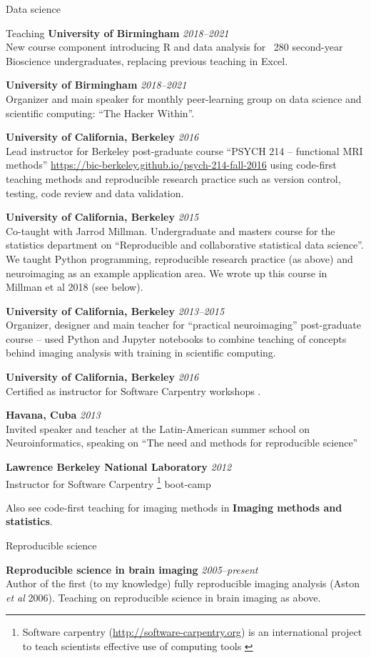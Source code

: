 \documentclass{cv}
\newcommand{\PlaceDateNote}[3]{{\bf #1} \hfill {\em #2} \\#3}
\newcommand{\UoB}{University of Birmingham}
\newcommand{\UCB}{University of California, Berkeley}
\begin{document}
\begin{cvSection}{Data science}
\begin{cvSubSection}{Teaching}
\PlaceDateNote{\UoB}{2018--2021} {New course component introducing R and
    data analysis for ~280 second-year Bioscience undergraduates, replacing
    previous teaching in Excel.}

\PlaceDateNote{\UoB}{2018--2021}
    {Organizer and main speaker for monthly peer-learning group on data science
    and scientific computing: ``The Hacker Within''.}

\PlaceDateNote{\UCB}{2016}
{Lead instructor for Berkeley post-graduate course ``PSYCH 214 -- functional
    MRI methods'' \url{https://bic-berkeley.github.io/psych-214-fall-2016}
    using code-first teaching methods and reproducible research practice such
    as version control, testing, code review and data validation.}

\PlaceDateNote{\UCB}{2015}
{Co-taught with Jarrod Millman.  Undergraduate and masters course for the
    statistics department on ``Reproducible and collaborative statistical data
    science''.  We taught Python programming, reproducible research practice
    (as above) and neuroimaging as an example application area.  We wrote up
    this course in Millman et al 2018 (see below).}

\PlaceDateNote{\UCB}{2013--2015} {Organizer, designer and main teacher for
    ``practical neuroimaging'' post-graduate course -- used Python and Jupyter
    notebooks to combine teaching of concepts behind imaging analysis with
    training in scientific computing.}

\PlaceDateNote{\UCB}{2016} {Certified as instructor for Software Carpentry
    workshops \footref{swc}.}

\PlaceDateNote{Havana, Cuba}{2013} {Invited speaker and teacher at the
    Latin-American summer school on Neuroinformatics, speaking on ``The need
    and methods for reproducible science''}

\PlaceDateNote{Lawrence Berkeley National Laboratory}{2012} {Instructor for
    Software Carpentry \footnote{ Software carpentry
    (\url{http://software-carpentry.org}) is an international project to teach
    scientists effective use of computing tools \label{swc}} boot-camp}

Also see code-first teaching for imaging methods in {\bf Imaging methods and
    statistics}.

\end{cvSubSection}

\begin{cvSubSection}{Reproducible science}

\PlaceDateNote{Reproducible science in brain imaging}{2005--present}
{Author of the first (to my knowledge) fully reproducible imaging analysis
    (Aston {\em et al} 2006).  Teaching on reproducible science in brain
    imaging as above.

}
\end{cvSubSection}
\end{cvSection}
\end{document}
